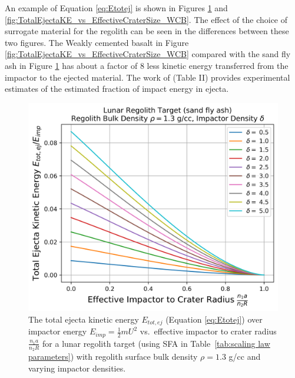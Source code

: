 \documentclass{article}
\begin{document}
An example of Equation \eqref{eq:Etotej} is shown in Figures \ref{fig:TotalEjectaKE_vs_EffectiveCraterSize} and \ref{fig:TotalEjectaKE_vs_EffectiveCraterSize_WCB}. The effect of the choice of surrogate material for the regolith can be seen in the differences between these two figures. The Weakly cemented basalt in Figure \ref{fig:TotalEjectaKE_vs_EffectiveCraterSize_WCB} compared with the sand fly ash in Figure \ref{fig:TotalEjectaKE_vs_EffectiveCraterSize} has about a factor of $8$ less kinetic energy transferred from the impactor to the ejected material. The work of \cite{hartmann1985impact} (Table II) provides experimental estimates of the estimated fraction of impact energy in ejecta.


\begin{figure}[!htb]
	\centering
	\includegraphics[width=0.65\linewidth]{TotalEjectaKE_vs_EffectiveCraterSize.png}
	\caption{The total ejecta kinetic energy $E_{tot,ej}$ (Equation \eqref{eq:Etotej}) over impactor energy $E_{imp} = \frac{1}{2}mU^2$ vs.\ effective impactor to crater radius $\frac{n_1 a}{n_2 R}$ for a lunar regolith target (using SFA in Table~\ref{tab:scaling law parameters}) with regolith surface bulk density $\rho = 1.3$ g/cc and varying impactor densities. }\label{fig:TotalEjectaKE_vs_EffectiveCraterSize}
\end{figure}
\end{document}
